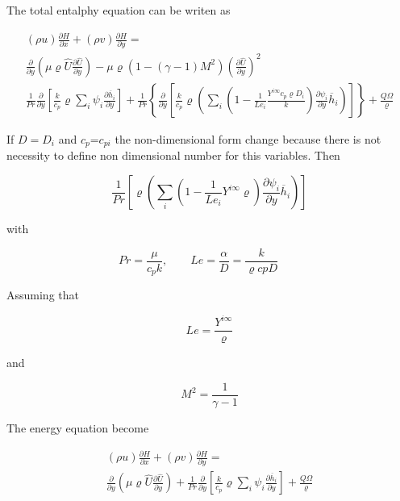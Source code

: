 The total entalphy equation can be writen as 

\begin{equation} 
\begin{split}
(\rho u)\frac{\partial H}{\partial x}    
+
(\rho v)\frac{\partial H}{\partial y}    
=
 \\
\frac{\partial}{\partial y}\left(\mu \varrho\hat{U}\frac{\partial \hat{U}}{\partial  y}\right)
-
\mu 
\varrho
\left(
1-
(\gamma-1)M^2
\right)
\left(
\frac{\partial \hat{U}}{\partial y}
\right)
^2
\\
\frac{1}{Pr}
\frac{\partial}{\partial y}
\left[
       \frac{k}{c_p}
       \varrho 
       \sum_{i} \psi_i \frac{\partial \overline{h}_i}{\partial y}
\right]
+
\frac{1}{Pr}
\left\{
\frac{\partial}{\partial y}
\left[
\frac{k}{c_p}
\varrho
\left(
       \sum_{i} 
       \left(
       1
       -
       \frac{1}{Le_i}
       \frac{Y^{i\infty}c_p
       \varrho D_i}{k}
       \right)
       \frac{\partial \psi_i}{\partial y} \overline{h}_i
\right)
\right]
\right\}
+
\frac{Q\Omega}{\varrho}
\end{split}
\end{equation}       

If $D=D_i$ and $c_p$=$c_{pi}$
the non-dimensional form change
because there is not necessity 
to define non dimensional number 
for this variables. Then  

\begin{equation}
\frac{1}{Pr}
\left[
\varrho
\left(
       \sum_{i} 
       \left(
       1
       -
       \frac{1}{Le_i}
       Y^{i\infty}
       \varrho 
       \right)
       \frac{\partial \psi_i}{\partial y} \overline{h}_i
\right)
\right]
\end{equation}       

with

\begin{equation}
Pr=\frac{\mu}{c_pk}
,
\qquad
Le=\frac{\alpha}{D}
=
\frac{k}{\varrho cp D}
\qquad
\end{equation}

Assuming that 
       
\begin{equation}
       Le
       =
       \frac{Y^{i\infty}}
       {\varrho}
\end{equation}       

and 

\begin{equation}
       M^2=\frac{1}{\gamma-1}
\end{equation}       

The energy equation become

\begin{equation} 
\begin{split}
(\rho u)\frac{\partial H}{\partial x}    
+
(\rho v)\frac{\partial H}{\partial y}    
=
\\
\frac{\partial}{\partial y}
\left(
       \mu \varrho\hat{U}
       \frac{\partial \hat{U}}{\partial  y}
       \right)
+
\frac{1}{Pr}
\frac{\partial}{\partial y}
\left[
       \frac{k}{c_p}
       \varrho 
       \sum_{i} \psi_i \frac{\partial \overline{h}_i}{\partial y}
\right]
+
\frac{Q\Omega}{\varrho}
\end{split}
\end{equation}       